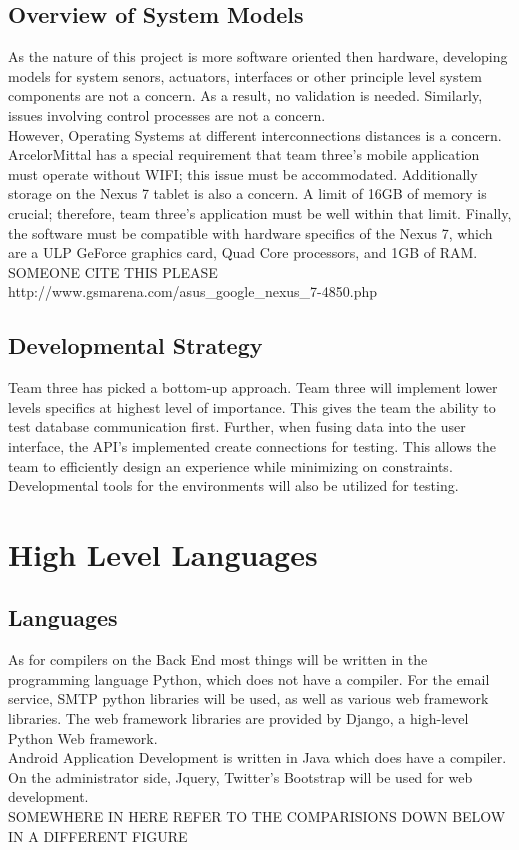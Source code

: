 \documentclass[Letter,11pt]{article}
\begin{document}
	\subsection{Overview of System Models}
	As the nature of this project is more software oriented then hardware, developing models for system senors, actuators, interfaces or other principle level system components are not a concern. As a result, no validation is needed. Similarly, issues involving control processes are not a concern. \\
	However, Operating Systems at different interconnections distances is a concern. ArcelorMittal has a special requirement that team three's mobile application must operate without WIFI; this issue must be accommodated. Additionally storage on the Nexus 7 tablet is also a concern. A limit of 16GB of memory is crucial; therefore, team three's application must be well within that limit.  Finally, the software must be compatible with hardware specifics of the Nexus 7, which are a ULP GeForce graphics card, Quad Core processors, and 1GB of RAM. \\
	
	SOMEONE CITE THIS PLEASE http://www.gsmarena.com/asus_google_nexus_7-4850.php \\
	
	\subsection{Developmental Strategy}
	Team three has picked a bottom-up approach. Team three will implement lower levels specifics at highest level of importance. This gives the team the ability to test database communication first. Further, when fusing data into the user interface, the API's implemented create connections for testing. This allows the team to efficiently design an experience while minimizing on constraints. Developmental tools for the environments will also be utilized for testing. \\ 

\section{High Level Languages}\label{highlevel}
	\subsection{Languages}
	As for compilers on the Back End most things will be written in the programming language Python, which does not have a compiler. For the email service, SMTP python libraries will be used, as well as various web framework libraries. The web framework libraries are provided by Django, a high-level Python Web framework. \\
	Android Application Development is written in Java which does have a compiler. On the administrator side, Jquery, Twitter's Bootstrap will be used for web development.   \\ SOMEWHERE IN HERE REFER TO THE COMPARISIONS DOWN BELOW IN A DIFFERENT FIGURE
\end{document}

